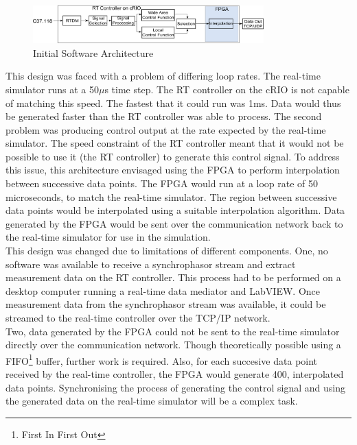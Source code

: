 \documentclass[conference]{IEEEtran}
\begin{document}
\begin{figure}[!th]
\centering
\includegraphics[width=3.5in]{InitialArch}
\caption{Initial Software Architecture}
\label{fig:InitialArch}
\end{figure}



This design was faced with a problem of differing loop rates. The real-time simulator runs at a 50$\mu$s time step. The RT controller on the cRIO is not capable of matching this speed. The fastest that it could run was 1ms. Data would thus be generated faster than the RT controller was able to process. The second problem was producing control output at the rate expected by the real-time simulator. The speed constraint of the RT controller meant that it would not be possible to use it (the RT controller) to generate this control signal. To address this issue, this architecture envisaged using the FPGA to perform interpolation between successive data points. The FPGA would run at a loop rate of 50 microseconds, to match the real-time simulator. The region between successive data points would be interpolated using a suitable interpolation algorithm. Data generated by the FPGA would be sent over the communication network back to the real-time simulator for use in the simulation.\\

This design was changed due to limitations of different components. One, no software was available to receive a synchrophasor stream and extract measurement data on the RT controller. This process had to be performed on a desktop computer running a real-time data mediator \cite{SDK} and LabVIEW. Once measurement data from the synchrophasor stream was available, it could be streamed to the real-time controller over the TCP/IP network.\\

Two, data generated by the FPGA could not be sent to the real-time simulator directly over the communication network. Though theoretically possible using a FIFO\footnote{First In First Out} buffer, further work is required. Also, for each succesive data point received by the real-time controller, the FPGA would generate 400, interpolated data points. Synchronising the process of generating the control signal and using the generated data on the real-time simulator will be a complex task.\\
\end{document}
